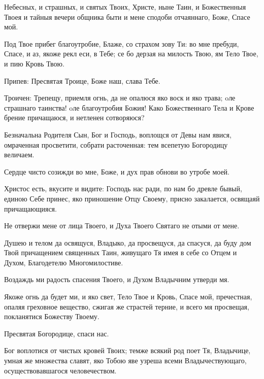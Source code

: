 Небесных, и страшных, и святых Твоих, Христе, ныне Таин, и Божественныя Твоея и тайныя вечери общника быти и мене сподоби отчаяннаго, Боже, Спасе мой.


Под Твое прибег благоутробие, Блаже, со страхом зову Ти: во мне пребуди, Спасе, и аз, якоже рекл еси, в Тебе; се бо дерзая на милость Твою, ям Тело Твое, и пию Кровь Твою.


Припев: Пресвятая Троице, Боже наш, слава Тебе.


Троичен: Трепещу, приемля огнь, да не опалюся яко воск и яко трава; oле страшнаго таинства! oле благоутробия Божия! Како Божественнаго Тела и Крове брение причащаюся, и нетленен сотворяюся?



Безначальна Родителя Сын, Бог и Господь, воплощся от Девы нам явися, омраченная просветити, собрати расточенная: тем всепетую Богородицу величаем.



Сердце чисто созижди во мне, Боже, и дух прав обнови во утробе моей.


Христос есть, вкусите и видите: Господь нас ради, по нам бо древле бывый, единою Себе принес, яко приношение Отцу Своему, присно закалается, освящаяй причащающияся.




Не отвержи мене от лица Твоего, и Духа Твоего Святаго не отыми от мене.


Душею и телом да освящуся, Владыко, да просвещуся, да спасуся, да буду дом Твой причащением священных Таин, живущаго Тя имея в себе со Отцем и Духом, Благодетелю Многомилостиве.




Воздаждь ми радость спасения Твоего, и Духом Владычним утверди мя.


Якоже огнь да будет ми, и яко свет, Тело Твое и Кровь, Спасе мой, пречестная, опаляя греховное вещество, сжигая же страстей терние, и всего мя просвещая, покланятися Божеству Твоему.




Пресвятая Богородице, спаси нас.



Бог воплотися от чистых кровей Твоих; темже всякий род поет Тя, Владычице, умная же множества славят, яко Тобою яве узреша всеми Владычествующаго, осуществовавшагося человечеством.

